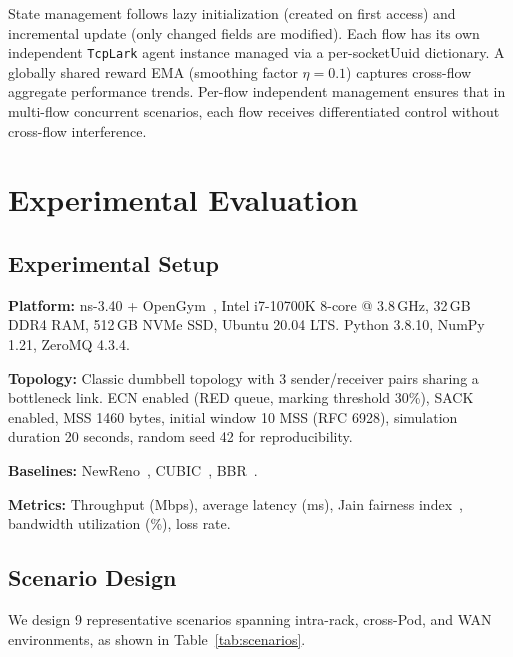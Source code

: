 \documentclass[10pt,twocolumn]{article}
\begin{document}
State management follows lazy initialization (created on first access) and incremental update (only changed fields are modified). Each flow has its own independent \texttt{TcpLark} agent instance managed via a per-socketUuid dictionary. A globally shared reward EMA (smoothing factor $\eta = 0.1$) captures cross-flow aggregate performance trends. Per-flow independent management ensures that in multi-flow concurrent scenarios, each flow receives differentiated control without cross-flow interference.

\section{Experimental Evaluation}

\subsection{Experimental Setup}

\textbf{Platform:} ns-3.40 + OpenGym~\cite{opengym}, Intel i7-10700K 8-core @ 3.8\,GHz, 32\,GB DDR4 RAM, 512\,GB NVMe SSD, Ubuntu 20.04 LTS. Python 3.8.10, NumPy 1.21, ZeroMQ 4.3.4.

\textbf{Topology:} Classic dumbbell topology with 3 sender/receiver pairs sharing a bottleneck link. ECN enabled (RED queue, marking threshold 30\%), SACK enabled, MSS 1460 bytes, initial window 10 MSS (RFC 6928), simulation duration 20 seconds, random seed 42 for reproducibility.

\textbf{Baselines:} NewReno~\cite{newreno}, CUBIC~\cite{cubic}, BBR~\cite{bbr}.

\textbf{Metrics:} Throughput (Mbps), average latency (ms), Jain fairness index~\cite{fairness}, bandwidth utilization (\%), loss rate.

\subsection{Scenario Design}

We design 9 representative scenarios spanning intra-rack, cross-Pod, and WAN environments, as shown in Table~\ref{tab:scenarios}.
\end{document}
